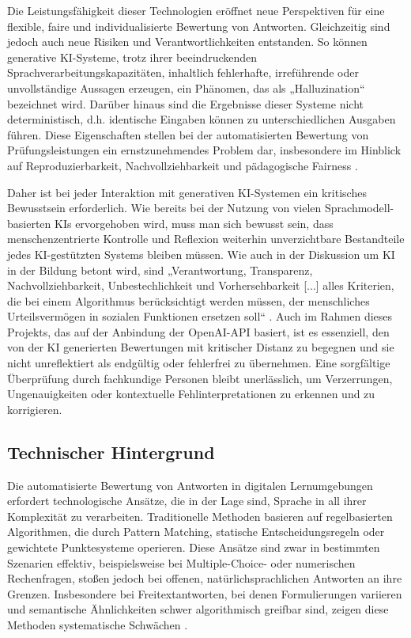 \documentclass[a4paper,12pt]{article}
\begin{document}
Die Leistungsfähigkeit dieser Technologien eröffnet neue Perspektiven für eine flexible, faire und individualisierte Bewertung von Antworten. Gleichzeitig sind jedoch auch neue Risiken und Verantwortlichkeiten entstanden. So können generative KI-Systeme, trotz ihrer beeindruckenden Sprachverarbeitungskapazitäten, inhaltlich fehlerhafte, irreführende oder unvollständige Aussagen erzeugen, ein Phänomen, das als „Halluzination“ bezeichnet wird. Darüber hinaus sind die Ergebnisse dieser Systeme nicht deterministisch, d.h. identische Eingaben können zu unterschiedlichen Ausgaben führen. Diese Eigenschaften stellen bei der automatisierten Bewertung von Prüfungsleistungen ein ernstzunehmendes Problem dar, insbesondere im Hinblick auf Reproduzierbarkeit, Nachvollziehbarkeit und pädagogische Fairness \parencite{openai_reasoning, luckin}.

Daher ist bei jeder Interaktion mit generativen KI-Systemen ein kritisches Bewusstsein erforderlich. Wie bereits bei der Nutzung von vielen Sprachmodell-basierten KIs ervorgehoben wird, muss man sich bewusst sein, dass menschenzentrierte Kontrolle und Reflexion weiterhin unverzichtbare Bestandteile jedes KI-gestützten Systems bleiben müssen. Wie auch in der Diskussion um KI in der Bildung betont wird, sind „Verantwortung, Transparenz, Nachvollziehbarkeit, Unbestechlichkeit und Vorhersehbarkeit [...] alles Kriterien, die bei einem Algorithmus berücksichtigt werden müssen, der menschliches Urteilsvermögen in sozialen Funktionen ersetzen soll“ \parencite[39]{luckin}. Auch im Rahmen dieses Projekts, das auf der Anbindung der OpenAI-API basiert, ist es essenziell, den von der KI generierten Bewertungen mit kritischer Distanz zu begegnen und sie nicht unreflektiert als endgültig oder fehlerfrei zu übernehmen. Eine sorgfältige Überprüfung durch fachkundige Personen bleibt unerlässlich, um Verzerrungen, Ungenauigkeiten oder kontextuelle Fehlinterpretationen zu erkennen und zu korrigieren. \parencite{luckin}

\newpage

\subsection{Technischer Hintergrund}
Die automatisierte Bewertung von Antworten in digitalen Lernumgebungen erfordert technologische Ansätze, die in der Lage sind, Sprache in all ihrer Komplexität zu verarbeiten. Traditionelle Methoden basieren auf regelbasierten Algorithmen, die durch Pattern Matching, statische Entscheidungsregeln oder gewichtete Punktesysteme operieren. Diese Ansätze sind zwar in bestimmten Szenarien effektiv, beispielsweise bei Multiple-Choice- oder numerischen Rechenfragen, stoßen jedoch bei offenen, natürlichsprachlichen Antworten an ihre Grenzen. Insbesondere bei Freitextantworten, bei denen Formulierungen variieren und semantische Ähnlichkeiten schwer algorithmisch greifbar sind, zeigen diese Methoden systematische Schwächen \parencite{jurafsky}.
\end{document}
